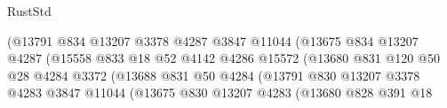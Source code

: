 \begin{lexlean}{RustStd}
\begin{coremodule}
                                              (@13791
                                                @834
                                                @13207
                                                @3378
                                                @4287
                                                @3847
                                                @11044
                                                (@13675
                                                  @834
                                                  @13207
                                                  @4287
                                                  (@15558
                                                    @833
                                                    @18
                                                    @52
                                                    @4142
                                                    @4286
                                                    @15572
                                                    (@13680
                                                      @831
                                                      @120
                                                      @50
                                                      @28
                                                      @4284
                                                      @3372
                                                      (@13688
                                                        @831
                                                        @50
                                                        @4284
                                                        (@13791
                                                          @830
                                                          @13207
                                                          @3378
                                                          @4283
                                                          @3847
                                                          @11044
                                                          (@13675
                                                            @830
                                                            @13207
                                                            @4283
                                                            (@13680
                                                              @828
                                                              @391
                                                              @18

\end{coremodule}
\end{lexlean}
